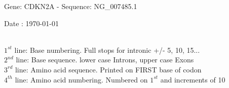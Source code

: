 \documentclass{article}
\begin{document}
\renewcommand{\footrulewidth}{1pt}
\renewcommand{\headrulewidth}{0pt}
\begin{center}
\begin{large}
 Gene: CDKN2A - Sequence: NG\_007485.1
 
 Date : \today\\\\
\end{large}
\end{center}
$1^{st}$ line: Base numbering. Full stops for intronic +/- 5, 10, 15...\\
$2^{nd}$ line: Base sequence. lower case Introns, upper case Exons\\
$3^{rd}$ line: Amino acid sequence. Printed on FIRST base of codon\\
$4^{th}$ line: Amino acid numbering. Numbered on $1^{st}$ and increments of 10\\
\end{document}
